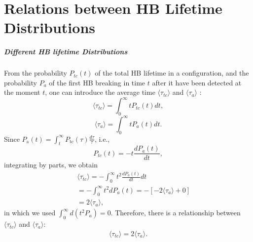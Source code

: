 \chapter{Relations between HB Lifetime Distributions}\label{relation_hbd}
\paragraph{Different HB lifetime Distributions}\label{diff_distr}
From the probability $P_{tc}(t)$ of the total HB lifetime in a configuration, and the probability $P_{a}$ of 
the first HB breaking in time $t$ after it have been detected at the moment $t$, one can introduce the average time 
$\langle \tau_{tc}\rangle$ and $\langle \tau_{a}\rangle$ :
\begin{equation}
\langle \tau_{tc}\rangle = \int_0^\infty t P_{tc}(t) dt,
\label{eq:tau_tc}
\end{equation}
\begin{equation}
\langle \tau_{a}\rangle = \int_0^\infty t P_a(t) dt. 
\label{eq:tau_a}
\end{equation}
Since $P_{\mathrm{a}}(t)=\int_{t}^{\infty} P_{\mathrm{tc}}(\tau) \frac{d \tau}{\tau}$, i.e., 
\begin{equation}
P_{tc}(t) = -t\frac{dP_a(t)}{dt}, \nonumber
\label{eq:relation_Ptc--Pa}
\end{equation}
integrating by parts, we obtain
\begin{eqnarray}
&&\langle \tau_{tc}\rangle = -\int_0^\infty t^2 \frac{dP_a(t)}{dt}dt \nonumber \\
&&= -\int_0^\infty t^2 dP_a(t) = -[-2\langle \tau_{a}\rangle + 0] \nonumber\\
&&= 2\langle \tau_{a}\rangle,\nonumber
\end{eqnarray}
in which we used $\int_0^\infty d(t^2 P_a)=0$.
Therefore, there is a relationship between $\langle \tau_{tc} \rangle$ and $\langle \tau_a \rangle$:
\begin{eqnarray}
\langle \tau_{tc}\rangle = 2\langle \tau_{a}\rangle.
\label{eq:relation_tau_tc--t_a}
\end{eqnarray}

